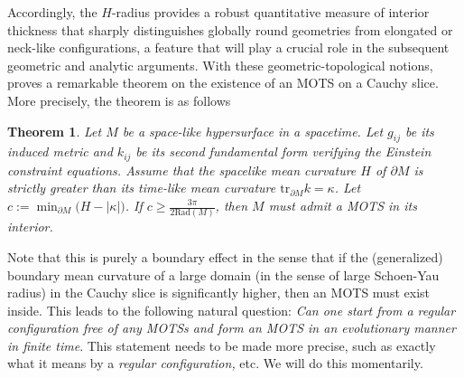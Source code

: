 \documentclass{amsart}
\newtheorem{theorem}{Theorem}[section]
\newcommand{\tr}{\mbox{tr}}
\begin{document}
\noindent Accordingly, the $H$-radius provides a robust quantitative measure of interior thickness that sharply distinguishes globally round geometries from elongated or neck-like configurations, a feature that will play a crucial role in the subsequent geometric and analytic arguments.
  With these geometric-topological notions, \cite{yau} proves a remarkable theorem on the existence of an MOTS on a Cauchy slice. More precisely, the theorem is as follows 
\begin{theorem}\cite{yau}
\label{motivation}
Let $M$ be a space-like hypersurface in a spacetime. Let
$g_{ij}$ be its induced metric and $k_{ij}$ be its second fundamental form verifying the Einstein constraint equations. Assume that the spacelike mean curvature $H$ of $\partial M$ is strictly greater than its time-like mean curvature $\tr_{\partial M}k=\kappa$. Let $c:=\min_{\partial M}\bigg({H-|\kappa|}\bigg)$. If $c\geq \frac{3\pi}{2\text{Rad}(M)}$, then $M$ must admit a MOTS in its interior.  
\end{theorem}
\noindent Note that this is purely a boundary effect in the sense that if the (generalized) boundary mean curvature of a large domain (in the sense of large Schoen-Yau radius) in the Cauchy slice is significantly higher, then an MOTS must exist inside. This leads to the following natural question: \textit{Can one start from a regular configuration free of any MOTSs and form an MOTS in an evolutionary manner in finite time}. This statement needs to be made more precise, such as exactly what it means by a \textit{regular configuration,} etc. We will do this momentarily.
\end{document}
